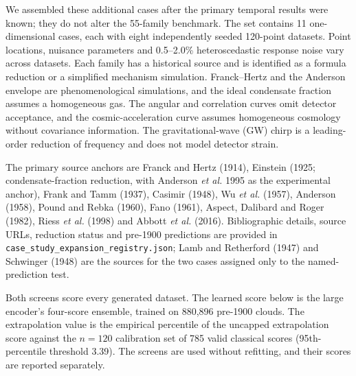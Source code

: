 \documentclass{article}
\begin{document}
We assembled these additional cases after the primary temporal results were known; they do not alter the 55-family benchmark. The set contains 11 one-dimensional cases, each with eight independently seeded 120-point datasets. Point locations, nuisance parameters and 0.5--2.0\% heteroscedastic response noise vary across datasets. Each family has a historical source and is identified as a formula reduction or a simplified mechanism simulation. Franck--Hertz and the Anderson envelope are phenomenological simulations, and the ideal condensate fraction assumes a homogeneous gas. The angular and correlation curves omit detector acceptance, and the cosmic-acceleration curve assumes homogeneous cosmology without covariance information. The gravitational-wave (GW) chirp is a leading-order reduction of frequency and does not model detector strain.

The primary source anchors are Franck and Hertz (1914), Einstein (1925; condensate-fraction reduction, with Anderson \emph{et al.} 1995 as the experimental anchor), Frank and Tamm (1937), Casimir (1948), Wu \emph{et al.} (1957), Anderson (1958), Pound and Rebka (1960), Fano (1961), Aspect, Dalibard and Roger (1982), Riess \emph{et al.} (1998) and Abbott \emph{et al.} (2016). Bibliographic details, source URLs, reduction status and pre-1900 predictions are provided in \nolinkurl{case_study_expansion_registry.json}; Lamb and Retherford (1947) and Schwinger (1948) are the sources for the two cases assigned only to the named-prediction test.

Both screens score every generated dataset. The learned score below is the large encoder's four-score ensemble, trained on 880,896 pre-1900 clouds. The extrapolation value is the empirical percentile of the uncapped extrapolation score against the $n = 120$ calibration set of 785 valid classical scores (95th-percentile threshold 3.39). The screens are used without refitting, and their scores are reported separately.
\end{document}
